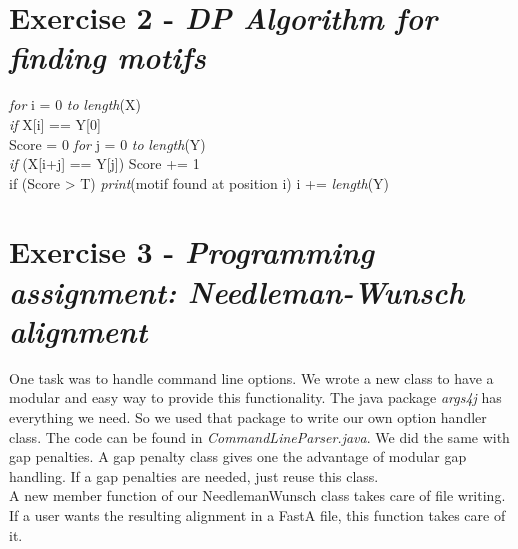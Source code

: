 \documentclass[%
   10pt,              %
   ngerman,           %
   a4paper,           %
   DIV11,             %
]{scrartcl}%
\begin{document}
  \section*{Exercise 2 - \textsl{DP Algorithm for finding motifs}}
  \emph{for} i = 0 \emph{to} \emph{length}(X)\\
  \indent \emph{if} X[i] == Y[0]\\
  \indent \indent Score = 0
  \indent \indent \emph{for} j = 0 \emph{to} \emph{length}(Y)\\
  \indent \indent \indent \emph{if} (X[i+j] == Y[j]) Score += 1\\
  \indent \indent if (Score > T) 
  \indent \indent \indent \emph{print}(motif found at position i)
  \indent \indent \indent i += \emph{length}(Y)
 
  \section*{Exercise 3 - \textsl{Programming assignment: Needleman-Wunsch alignment}}
  One task was to handle command line options. We wrote a new class to have a modular 
  and easy way to provide this functionality. The java package \textit{args4j} has everything
  we need. So we used that package to write our own option handler class. The code can 
  be found in \textit{CommandLineParser.java}. We did the same with gap penalties. A
  gap penalty class gives one the advantage of modular gap handling. If a gap penalties are
  needed, just reuse this class.\\
  A new member function of our NeedlemanWunsch class takes care of file writing. If a user 
  wants the resulting alignment in a FastA file, this function takes care of it.
\end{document}
